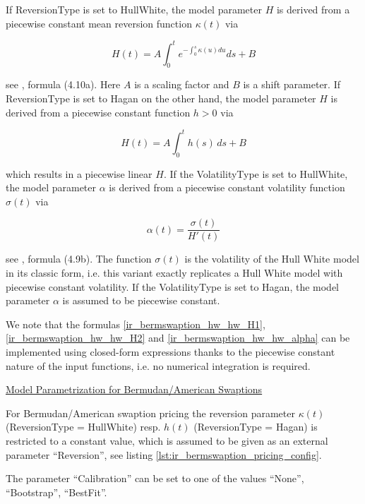 If ReversionType is set to HullWhite, the model parameter $H$ is derived from a piecewise constant mean reversion
function $\kappa(t)$ via

\begin{equation}\label{ir_bermswaption_hw_hw_H1}
  H(t) = A \int_0^t e^{-\int_0^s \kappa(u) du} ds + B
\end{equation}

see \cite{Hagan_LGM}, formula (4.10a). Here $A$ is a scaling factor and $B$ is a shift parameter. If ReversionType is set
to Hagan on the other hand, the model parameter $H$ is derived from a piecewise constant function $h>0$ via

\begin{equation}\label{ir_bermswaption_hw_hw_H2}
  H(t) = A \int_0^t h(s)\,ds + B
\end{equation}

which results in a piecewise linear $H$. If the VolatilityType is set to HullWhite, the model parameter $\alpha$ is
derived from a piecewise constant volatility function $\sigma(t)$ via

\begin{equation}\label{ir_bermswaption_hw_hw_alpha}
  \alpha(t) = \frac{\sigma(t)}{H'(t)}
\end{equation}

see \cite{Hagan_LGM}, formula (4.9b). The function $\sigma(t)$ is the volatility of the Hull White model in its classic
form, i.e. this variant exactly replicates a Hull White model with piecewise constant volatility. If the VolatilityType
is set to Hagan, the model parameter $\alpha$ is assumed to be piecewise constant.

We note that the formulas \ref{ir_bermswaption_hw_hw_H1}, \ref{ir_bermswaption_hw_hw_H2} and
\ref{ir_bermswaption_hw_hw_alpha} can be implemented using closed-form expressions thanks to the piecewise constant
nature of the input functions, i.e. no numerical integration is required.



\underline{Model Parametrization for Bermudan/American Swaptions}

For Bermudan/American swaption pricing the reversion parameter $\kappa(t)$ (ReversionType = HullWhite) resp. $h(t)$
(ReversionType = Hagan) is restricted to a constant value, which is assumed to be given as an external parameter
``Reversion'', see listing \ref{lst:ir_bermswaption_pricing_config}.

The parameter ``Calibration'' can be set to one of the values ``None'', ``Bootstrap'', ``BestFit''.

